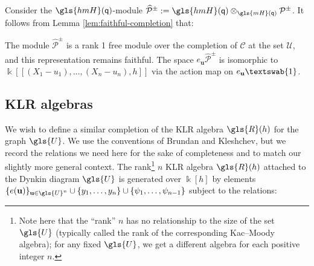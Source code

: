 \documentclass[ALCO,ThmDefs,Unicode,epreuves]{cedram}
\newcommand{\pq}{\mathsf{q}}
\newcommand{\hone}{\text{\textswab{1}}}
\newcommand{\K}{\Bbbk}%
\newcommand{\Bu}{\mathbf{u}}
\newcommand{\cP}{\mathcal{P}}
\newcommand{\hmH}{\gls{hmH}}
\newcommand{\hcP}{\widehat{\cP}}
\newcommand\llbracket{[\![}
\newcommand\rrbracket{]\!]}
\begin{document}
Consider the $\hmH(\pq)$-module $\hcP^\pm :=\hmH(\pq)
\otimes_{\gls{mH}(\pq)}\cP^\pm$. It follows from Lemma
\ref{lem:faithful-completion} that:
\begin{lemma}\label{lem:Hecke-P}
 The module $\hcP^\pm$ is a rank 1 free module over the completion
 of $\mathcal{C} $ at the set $\mathcal{U}$, and this
 representation remains faithful. The space $e_{\Bu}\hcP^\pm $ is isomorphic to
$\K\llbracket (X_1-{u_1}),\dots, (X_n-{u_n}),h\rrbracket $ via the action map on
$e_{\Bu}\hone$.
 \end{lemma}

\subsection{KLR algebras}

We wish to define a similar completion of the KLR algebra $\gls{R}(h)$ for the
graph $\gls{U}$. We use the conventions of Brundan and Kleshchev, but we
record the relations we need here for the sake of completeness and to
match our slightly more general context. The rank\footnote{Note here
 that the ``rank'' $n$ has no relationship to the size of the set $\gls{U}$
(typically called the rank of the corresponding Kac--Moody algebra);
for any fixed $\gls{U}$, we get a different algebra for each positive
integer $n$.} $n$ KLR algebra $\gls{R}(h)$ attached to the Dynkin
diagram $\gls{U}$ is
generated over $\K[h]$ 
by elements $\{e(\Bu)\}_{\Bu\in \gls{U}^n}\cup \{y_1,\dots, y_n\}\cup \{\psi_1,\dots, \psi_{n-1}\}$
subject to the relations:
\end{document}
